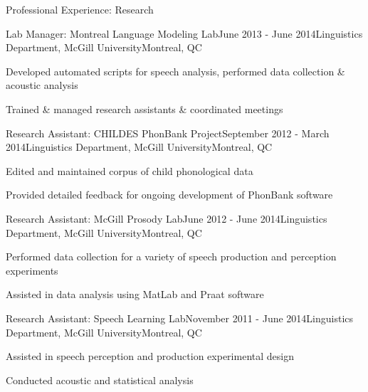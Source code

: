 \documentclass{resume} %
\begin{document}
\begin{rSection}{Professional Experience: Research}
	
	\begin{rSubsection}{Lab Manager: Montreal Language Modeling Lab}{June 2013 - June 2014}{Linguistics Department, McGill University}{Montreal, QC}
	\item Developed automated scripts for speech analysis, performed data collection \& acoustic analysis
	\item Trained \& managed research assistants \& coordinated meetings
	\end{rSubsection}
	
	
	\begin{rSubsection}{Research Assistant: CHILDES PhonBank Project}{September 2012 - March 2014}{Linguistics Department, McGill University}{Montreal, QC}
	\item Edited and maintained corpus of child phonological data
	\item Provided detailed feedback for ongoing development of PhonBank software
	\end{rSubsection}
	
	
	\begin{rSubsection}{Research Assistant: McGill Prosody Lab}{June 2012 - June 2014}{Linguistics Department, McGill University}{Montreal, QC}
	\item Performed data collection for a variety of speech production and perception experiments
	\item Assisted in data analysis using MatLab and Praat software
	\end{rSubsection}
	
	
	\begin{rSubsection}{Research Assistant: Speech Learning Lab}{November 2011 - June 2014}{Linguistics Department, McGill University}{Montreal, QC}
	\item Assisted in speech perception and production experimental design
	\item Conducted acoustic and statistical analysis
	\end{rSubsection}

\end{rSection}

\end{document}
